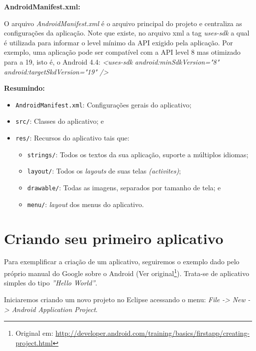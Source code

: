 \documentclass[a4paper,12pt,brazil,oneside]{book}
\begin{document}
\begin{singlespace}
\textbf{AndroidManifest.xml:}

O arquivo \emph{AndroidManifest.xml} é o arquivo principal do projeto e centraliza as configurações da aplicação. Note que existe, no arquivo xml a tag \emph{uses-sdk} a qual é utilizada para informar o level mínimo da API exigido pela aplicação. Por exemplo, uma aplicação pode ser compatível com a API level 8 mas otimizado para a 19, isto é, o Android 4.4: \emph{<uses-sdk android:minSdkVersion="8"   android:targetSkdVersion="19"  />}



\textbf{Resumindo:}
\begin{itemize}
\item \texttt{AndroidManifest.xml}: Configurações gerais do aplicativo;
\item \texttt{src/}: Classes do aplicativo; e
\item \texttt{res/}: Recursos do aplicativo tais que:
	\begin{itemize}
		\item \texttt{strings/}: Todos os textos da sua aplicação, suporte a múltiplos idiomas;	
		\item \texttt{layout/}: Todos os \emph{layouts} de suas telas \emph{(activites)};
		\item \texttt{drawable/}: Todas as imagens, separados por tamanho de tela; e
		\item \texttt{menu/}: \emph{layout} dos menus do aplicativo.
	\end{itemize}
\end{itemize}

\section{Criando seu primeiro aplicativo}
Para exemplificar a criação de um aplicativo, seguiremos o exemplo dado pelo próprio manual do Google sobre o Android 
(Ver original\footnote{Original em: \href{http://developer.android.com/training/basics/firstapp/creating-project.html}{http://developer.android.com/training/basics/firstapp/creating-project.html}}). 
Trata-se de aplicativo simples do tipo \emph{''Hello World''}.

Iniciaremos criando um novo projeto no Eclipse acessando o menu: \emph{File -> New -> Android Application Project}.


\end{singlespace}
\end{document}
